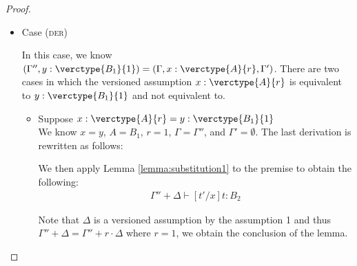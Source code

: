 \begin{proof}
\begin{itemize}
\item Case (\textsc{der})
\begin{center}
    \begin{minipage}{.38\linewidth}
    \end{minipage}
\end{center}
In this case, we know $(\Gamma'', y:\verctype{B_1}{1}) = (\Gamma, x:\verctype{A}{r}, \Gamma')$.
There are two cases in which the versioned assumption $x:\verctype{A}{r}$ is equivalent to $y:\verctype{B_1}{1}$ and not equivalent to.
\begin{itemize}
\item Suppose $x:\verctype{A}{r} = y:\verctype{B_1}{1}$\\
We know $x=y$, $A=B_1$, $r=1$, $\Gamma = \Gamma''$, and $\Gamma' = \emptyset$.
The last derivation is rewritten as follows:
\begin{center}
    \begin{minipage}{.38\linewidth}
    \end{minipage}
\end{center}
We then apply Lemma \ref{lemma:substitution1} to the premise to obtain the following:
\begin{align*}
    \Gamma'' + \Delta \vdash [t'/x]t : B_2
\end{align*}

Note that $\Delta$ is a versioned assumption by the assumption 1 and thus $\Gamma'' + \Delta = \Gamma'' + r\cdot\Delta$ where $r=1$, we obtain the conclusion of the lemma.


\end{itemize}
\end{itemize}
\end{proof}
